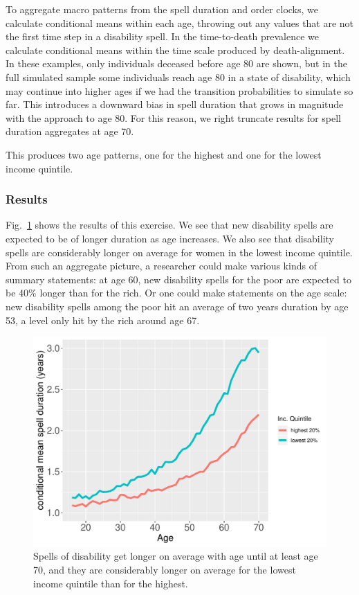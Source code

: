 \documentclass{article}
\begin{document}
To aggregate macro patterns from the spell duration and order clocks, we calculate conditional means within each age, throwing out any values that are not the first time step in a disability spell. In the time-to-death prevalence we calculate conditional means within the time scale produced by death-alignment. In these examples, only individuals deceased before age 80 are shown, but in the full simulated sample some individuals reach age 80 in a state of disability, which may continue into higher ages if we had the transition probabilities to simulate so far. This introduces a downward bias in spell duration that grows in magnitude with the approach to age 80. For this reason, we right truncate results for spell duration aggregates at age 70. 

This produces two age patterns, one for the highest and one for the lowest income quintile.
\FloatBarrier

\subsubsection{Results}
Fig.~\ref{fig:disdur} shows the results of this exercise. We see that new disability spells are expected to be of longer duration as age increases. We also see that disability spells are considerably longer on average for women in the lowest income quintile. From such an aggregate picture, a researcher could make various kinds of summary statements: at age 60, new disability spells for the poor are expected to be 40\% longer than for the rich. Or one could make statements on the age scale: new disability spells among the poor hit an average of two years duration by age 53, a level only hit by the rich around age 67.

\begin{figure}
    \centering
    \includegraphics[scale=.8]{Spells/Figures/MeanDisabilitySpellDurationAge.pdf}
    \caption{Spells of disability get longer on average with age until at least age 70, and they are considerably longer on average for the lowest income quintile than for the highest.}
    \label{fig:disdur}
\end{figure}
\end{document}
